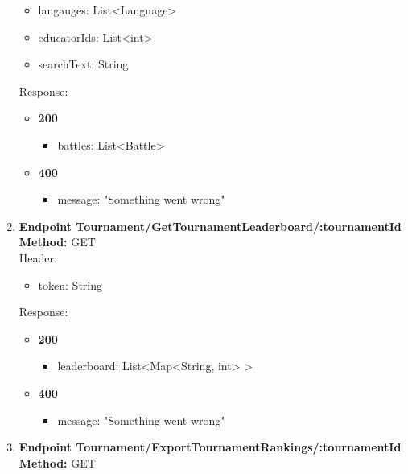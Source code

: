 \begin{enumerate}
\begin{itemize}
        \item langauges: List<Language>
        \item educatorIds: List<int>
        \item searchText: String
    \end{itemize}
    Response:\\
    \begin{itemize}
        \item \textbf{200} \\
        \begin{itemize}
            \item battles: List<Battle>
        \end{itemize}
        \item \textbf{400} \\
        \begin{itemize}
            \item message: "Something went wrong"
        \end{itemize}
    \end{itemize}
    \item \textbf{Endpoint Tournament/GetTournamentLeaderboard/:tournamentId} \\
    \textbf{Method:} GET \\
    Header:\\
    \begin{itemize}
        \item token: String
    \end{itemize}
    Response:\\
    \begin{itemize}
        \item \textbf{200} \\
        \begin{itemize}
            \item leaderboard: List<Map<String, int> >
        \end{itemize}
        \item \textbf{400} \\
        \begin{itemize}
            \item message: "Something went wrong"
        \end{itemize}
    \end{itemize}
    \item \textbf{Endpoint Tournament/ExportTournamentRankings/:tournamentId} \\
    \textbf{Method:} GET \\

\end{enumerate}
